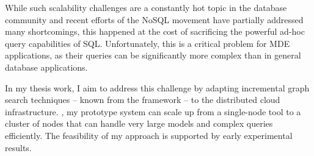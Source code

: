 While such scalability challenges are a constantly hot topic in the database community and recent efforts of the NoSQL movement have partially addressed many shortcomings, this happened at the cost of sacrificing the powerful ad-hoc query capabilities of SQL. Unfortunately, this is a critical problem for MDE applications, as their queries can be significantly more complex than in general database applications.

In my thesis work, I aim to address this challenge by adapting incremental graph search techniques -- known from the \incquery{} framework -- to the distributed cloud infrastructure. \incqueryD, my prototype system can scale up from a single-node tool to a cluster of nodes that can handle very large models and complex queries efficiently. The feasibility of my approach is supported by early experimental results.

\vfill

